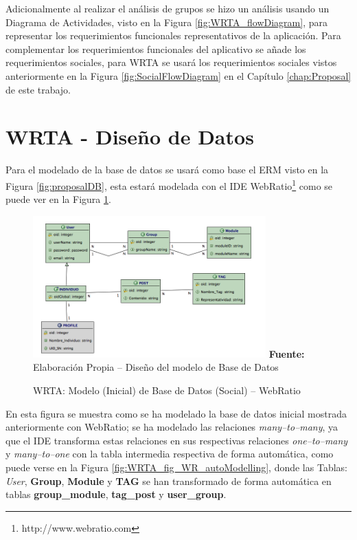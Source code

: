 \documentclass[oneside,12pt,a4paper]{memoir}%
\begin{document}
 
		Adicionalmente al realizar el an\'alisis de grupos se hizo un an\'alisis
		usando un Diagrama de Actividades, visto en la Figura \ref{fig:WRTA_flowDiagram},
		para representar los requerimientos funcionales representativos de la
		aplicaci\'on. Para complementar los requerimientos funcionales del aplicativo
		se a\~nade los requerimientos sociales, para WRTA se usar\'a los
		requerimientos sociales vistos anteriormente en la Figura
		\ref{fig:SocialFlowDiagram} en el Cap\'itulo \ref{chap:Proposal} de este trabajo.

	\section{WRTA - Dise\~no de Datos}
	\label{sec:dataDesign}
	Para el modelado de la base de datos se usar\'a como base el \ac{ERM} visto en
	la Figura \ref{fig:proposalDB}, esta estar\'a modelada con el \ac{IDE}
	WebRatio\footnote{http://www.webratio.com} como se puede ver en la Figura
	\ref{fig:WRTA_fig_WR_DataModel}.
 
	\begin{figure}[here]
		\centering 
		\caption{WRTA: Modelo (Inicial) de Base de Datos (Social) -- WebRatio}
		\includegraphics[width=0.8\textwidth]{figure/fig_WR_DataModel.png}
		\newline
		\textbf{Fuente:} Elaboraci\'on Propia -- Dise\~no del modelo de Base de Datos
		\label{fig:WRTA_fig_WR_DataModel}
	\end{figure} 
			
	En esta figura se muestra como se ha modelado la base de datos inicial
	mostrada anteriormente con WebRatio; se ha modelado las relaciones
	\textit{many--to--many}, ya que el \ac{IDE} transforma estas relaciones en
	sus respectivas relaciones \textit{one--to--many} y \textit{many--to--one} con
	la tabla intermedia respectiva de forma autom\'atica, como puede verse en la
	Figura \ref{fig:WRTA_fig_WR_autoModelling}, donde las Tablas: \textit{User},
	\textbf{Group}, \textbf{Module} y \textbf{TAG} se han transformado de forma
	autom\'atica en tablas \textbf{group\_module}, \textbf{tag\_post} y
	\textbf{user\_group}.
	
\end{document}
